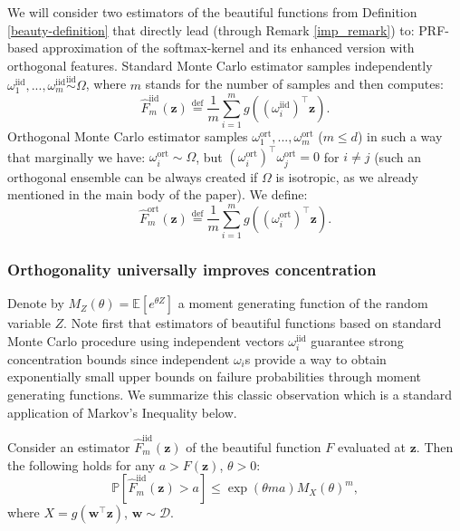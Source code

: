 We will consider two estimators of the beautiful functions from Definition \ref{beauty-definition} that directly lead (through Remark \ref{imp_remark}) to: PRF-based approximation of the softmax-kernel and its enhanced version with orthogonal features. Standard Monte Carlo estimator samples independently $\omega_{1}^{\mathrm{iid}},...,\omega_{m}^{\mathrm{iid}} \overset{\mathrm{iid}}{\sim} \Omega$, where $m$ stands for the number of samples and then computes:
\begin{equation}
\widehat{F}^{\mathrm{iid}}_{m}(\mathbf{z}) \overset{\mathrm{def}}{=}
\frac{1}{m} \sum_{i=1}^{m} g((\omega_{i}^{\mathrm{iid}})^{\top}\mathbf{z}).
\end{equation}
Orthogonal Monte Carlo estimator samples $\omega_{1}^{\mathrm{ort}},...,\omega_{m}^{\mathrm{ort}}$ ($m \leq d$) in such a way that marginally we have: $\omega_{i}^{\mathrm{ort}} \sim \Omega$, but $(\omega_{i}^{\mathrm{ort}})^{\top}\omega_{j}^{\mathrm{ort}}=0$ for $i \neq j$ (such an orthogonal ensemble can be always created if $\Omega$ is isotropic, as we already mentioned in the main body of the paper). We define:
\begin{equation}
\widehat{F}^{\mathrm{ort}}_{m}(\mathbf{z}) \overset{\mathrm{def}}{=}
\frac{1}{m} \sum_{i=1}^{m} g((\omega_{i}^{\mathrm{ort}})^{\top}\mathbf{z}).
\end{equation}

\subsubsection{Orthogonality universally improves concentration}

Denote by $M_{Z}(\theta) = \mathbb{E}[e^{\theta Z}]$ a moment generating function of the random variable $Z$.
Note first that estimators of beautiful functions based on standard Monte Carlo procedure using independent vectors $\omega_{i}^{\mathrm{iid}}$ guarantee strong concentration bounds since 
independent $\omega_{i}$s provide a way to obtain exponentially small upper bounds on failure probabilities through moment generating functions.
We summarize this classic observation which is a standard application of Markov's Inequality below. \\

\begin{lemma}
\label{iid-lemma}
Consider an estimator $\widehat{F}^{\mathrm{iid}}_{m}(\mathbf{z})$ of the beautiful function $F$ evaluated at $\mathbf{z}$. Then the following holds for any $a > F(\mathbf{z})$, $\theta > 0$:
\begin{equation}
\mathbb{P}[\widehat{F}^{\mathrm{iid}}_{m}(\mathbf{z}) > a] \leq \exp(\theta m a) M_X (\theta)^m,
\end{equation}
where $X = g(\mathbf{w}^{\top}\mathbf{z})$, $\mathbf{w} \sim \mathcal{D}$.
\end{lemma}

